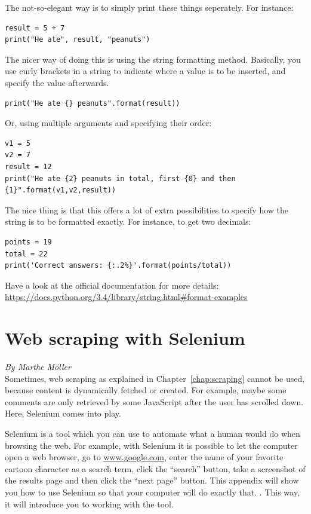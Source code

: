 \documentclass[a4paper,12pt]{book}
\begin{document}
\begin{appendices}
The not-so-elegant way is to simply print these things seperately. For instance:

\begin{lstlisting}
result = 5 + 7 
print("He ate", result, "peanuts")
\end{lstlisting}

The nicer way of doing this is using the string formatting method. Basically, you use curly brackets in a string to indicate where a value is to be inserted, and specify the value afterwards.


\begin{lstlisting}
print("He ate {} peanuts".format(result))
\end{lstlisting}

Or, using multiple arguments and specifying their order:

\begin{lstlisting}
v1 = 5
v2 = 7
result = 12
print("He ate {2} peanuts in total, first {0} and then {1}".format(v1,v2,result))
\end{lstlisting}

The nice thing is that this offers a lot of extra possibilities to specify how the string is to be formatted exactly. For instance, to get two decimals:

\begin{lstlisting}
points = 19
total = 22
print('Correct answers: {:.2%}'.format(points/total))
\end{lstlisting}

Have a look at the official documentation for more details: 
\url{https://docs.python.org/3.4/library/string.html#format-examples}


\chapter{Web scraping with Selenium}
\label{chap:selenium}
\emph{By Marthe M\"oller}\\



Sometimes, web scraping as explained in Chapter~\ref{chap:scraping} cannot be used, because content is dynamically fetched or created. For example, maybe some comments are only retrieved by some JavaScript after the user has scrolled down. Here, Selenium comes into play.

Selenium is a tool which you can use to automate what a human would do when browsing the web. For example, with Selenium it is possible to let the computer open a web browser, go to \url{www.google.com}, enter the name of your favorite cartoon character as a search term, click the ``search'' button, take a screenshot of the results page and then click the ``next page'' button. This appendix will show you how to use Selenium so that your computer will do exactly that. . This way, it will introduce you to working with the tool.   


\end{appendices}
\end{document}
